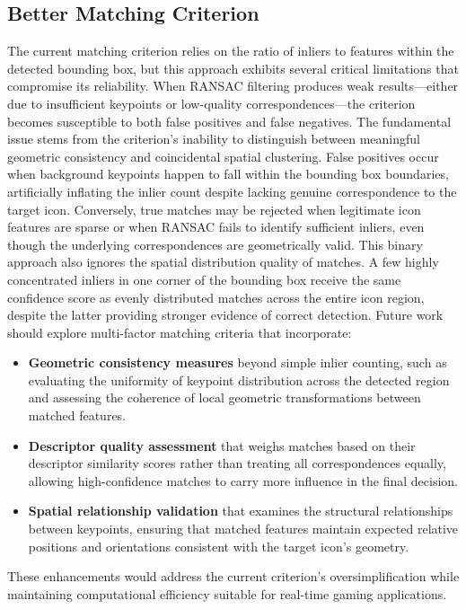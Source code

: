 \subsection{Better Matching Criterion}
The current matching criterion relies on the ratio of inliers to features
within the detected bounding box, but this approach exhibits several critical
limitations that compromise its reliability. When RANSAC filtering produces
weak results—either due to insufficient keypoints or low-quality
correspondences—the criterion becomes susceptible to both false positives and
false negatives. The fundamental issue stems from the criterion's inability to
distinguish between meaningful geometric consistency and coincidental spatial
clustering. False positives occur when background keypoints happen to fall
within the bounding box boundaries, artificially inflating the inlier count
despite lacking genuine correspondence to the target icon. Conversely, true
matches may be rejected when legitimate icon features are sparse or when RANSAC
fails to identify sufficient inliers, even though the underlying
correspondences are geometrically valid. This binary approach also ignores the
spatial distribution quality of matches. A few highly concentrated inliers in
one corner of the bounding box receive the same confidence score as evenly
distributed matches across the entire icon region, despite the latter providing
stronger evidence of correct detection. Future work should explore multi-factor
matching criteria that incorporate:
\begin{itemize}
    \item \textbf{Geometric consistency measures} beyond simple inlier counting, such as evaluating the uniformity of keypoint distribution across the detected region and assessing the coherence of local geometric transformations between matched features.
    \item \textbf{Descriptor quality assessment} that weighs matches based on their descriptor similarity scores rather than treating all correspondences equally, allowing high-confidence matches to carry more influence in the final decision.
    \item \textbf{Spatial relationship validation} that examines the structural relationships between keypoints, ensuring that matched features maintain expected relative positions and orientations consistent with the target icon's geometry.
\end{itemize}
These enhancements would address the current criterion's oversimplification while maintaining computational efficiency suitable for real-time gaming applications.

